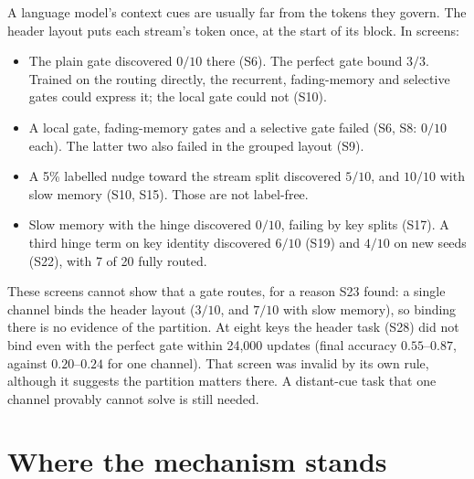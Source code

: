 \documentclass[11pt]{article}
\begin{document}
A language model's context cues are usually far from the tokens they govern. The header layout puts each stream's token once, at the start of its block. In screens:
\begin{itemize}
\item The plain gate discovered $0/10$ there (S6). The perfect gate bound $3/3$. Trained on the routing directly, the recurrent, fading-memory and selective gates could express it; the local gate could not (S10).
\item A local gate, fading-memory gates and a selective gate failed (S6, S8: $0/10$ each). The latter two also failed in the grouped layout (S9).
\item A 5\% labelled nudge toward the stream split discovered $5/10$, and $10/10$ with slow memory (S10, S15). Those are not label-free.
\item Slow memory with the hinge discovered $0/10$, failing by key splits (S17). A third hinge term on key identity discovered $6/10$ (S19) and $4/10$ on new seeds (S22), with 7 of 20 fully routed.
\end{itemize}
These screens cannot show that a gate routes, for a reason S23 found: a single channel binds the header layout ($3/10$, and $7/10$ with slow memory), so binding there is no evidence of the partition. At eight keys the header task (S28) did not bind even with the perfect gate within 24{,}000 updates (final accuracy $0.55$--$0.87$, against $0.20$--$0.24$ for one channel). That screen was invalid by its own rule, although it suggests the partition matters there. A distant-cue task that one channel provably cannot solve is still needed.

\section{Where the mechanism stands}
\label{sec:synthesis}
\end{document}
